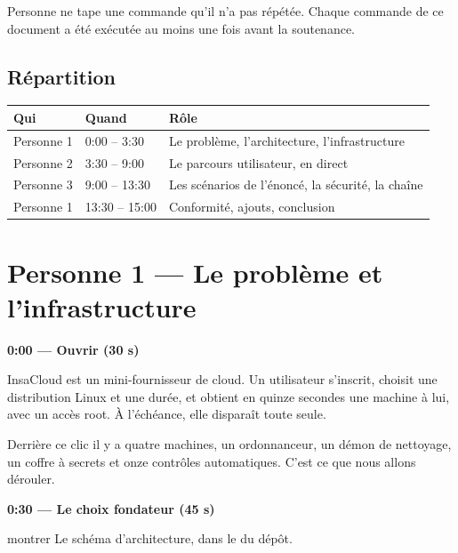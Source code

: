 \documentclass[a4paper,11pt,oneside]{report}
\newcommand{\minute}[1]{%
  \vspace{4pt}\noindent{\color{insared}\rule{3pt}{14pt}}\hspace{6pt}%
  {\large\bfseries #1}\par\vspace{3pt}}
\begin{document}
\begin{retenir}
Personne ne tape une commande qu'il n'a pas répétée. Chaque commande de ce
document a été exécutée au moins une fois avant la soutenance.
\end{retenir}

\section*{Répartition}

\begin{center}
\small
\begin{tabularx}{\textwidth}{@{}llX@{}}
\toprule
\textbf{Qui} & \textbf{Quand} & \textbf{Rôle} \\
\midrule
Personne 1 & 0:00 -- 3:30 & Le problème, l'architecture, l'infrastructure \\
Personne 2 & 3:30 -- 9:00 & Le parcours utilisateur, en direct \\
Personne 3 & 9:00 -- 13:30 & Les scénarios de l'énoncé, la sécurité, la chaîne \\
Personne 1 & 13:30 -- 15:00 & Conformité, ajouts, conclusion \\
\bottomrule
\end{tabularx}
\end{center}

\chapter{Personne 1 — Le problème et l'infrastructure}

\minute{0:00 — Ouvrir (30 s)}

\begin{adire}
InsaCloud est un mini-fournisseur de cloud. Un utilisateur s'inscrit, choisit
une distribution Linux et une durée, et obtient en quinze secondes une machine
à lui, avec un accès root. À l'échéance, elle disparaît toute seule.

\medskip
Derrière ce clic il y a quatre machines, un ordonnanceur, un démon de
nettoyage, un coffre à secrets et onze contrôles automatiques. C'est ce que
nous allons dérouler.
\end{adire}

\minute{0:30 — Le choix fondateur (45 s)}

\begin{afaire}{montrer}
Le schéma d'architecture, dans le  du dépôt.
\end{afaire}
\end{document}
